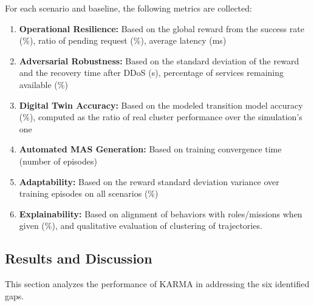 \noindent For each scenario and baseline, the following metrics are collected:
%
\begin{enumerate}[label=\textbf{\arabic*)}, itemjoin={;\quad }]
    \item \textbf{Operational Resilience:} Based on the global reward from the success rate (\%), ratio of pending request (\%), average latency (ms)
    \item \textbf{Adversarial Robustness:} Based on the standard deviation of the reward and the recovery time after DDoS (s), percentage of services remaining available (\%)
    \item \textbf{Digital Twin Accuracy:} Based on the modeled transition model accuracy (\%), computed as the ratio of real cluster performance over the simulation's one
    \item \textbf{Automated MAS Generation:} Based on training convergence time (number of episodes)
    \item \textbf{Adaptability:} Based on the reward standard deviation variance over training episodes on all scenarios (\%)
    \item \textbf{Explainability:} Based on alignment of behaviors with roles/missions when given (\%), and qualitative evaluation of clustering of trajectories.
\end{enumerate}



\subsection{Results and Discussion}
\label{sec:results}

This section analyzes the performance of KARMA in addressing the six identified gaps.


